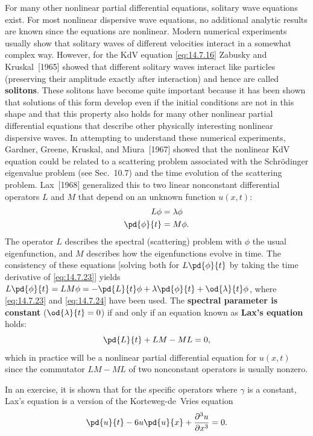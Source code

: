 For many other nonlinear partial differential equations, solitary wave equations exist.  For most nonlinear dispersive wave equations, no additional analytic results are known since the equations are nonlinear.  Modern numerical experiments usually show that solitary waves of different velocities interact in a somewhat complex way.  However, for the KdV equation \eqref{eq:14.7.16} Zabusky and Kruskal~[1965] showed that different solitary waves interact like particles (preserving their amplitude exactly after interaction) and hence are called \textbf{solitons}.  These solitons have become quite important because it has been shown that solutions of this form develop even if the initial conditions are not in this shape and that this property also holds for many other nonlinear partial differential equations that describe other physically interesting nonlinear dispersive waves.  In attempting to understand these numerical experiments, Gardner, Greene, Kruskal, and Miura~[1967] showed that the nonlinear KdV equation could be related to a scattering problem associated with the Schr\"odinger eigenvalue problem (see Sec.~10.7) and the time evolution of the scattering problem.  Lax~[1968] generalized this to two linear nonconstant differential operators $L$ and $M$ that depend on an unknown function $u(x,t)$:
\begin{align}
\label{eq:14.7.23}
L\phi &= \lambda\phi \\
\label{eq:14.7.24}
\pd{\phi}{t} &= M\phi.
\end{align}
The operator $L$ describes the spectral (scattering) problem with $\phi$ the usual eigenfunction, and $M$ describes how the eigenfunctions evolve in time.  The consistency of these equations [solving both for $L\pd{\phi}{t}$ by taking the time derivative of \eqref{eq:14.7.23}] yields $L\pd{\phi}{t} = LM\phi = -\pd{L}{t}\phi + \lambda\pd{\phi}{t} + \od{\lambda}{t}\phi$, where \eqref{eq:14.7.23} and \eqref{eq:14.7.24} have been used.  The \textbf{spectral parameter is constant} ($\od{\lambda}{t} = 0$) if and only if an equation known as \textbf{Lax's equation} holds:
\begin{equation}
\label{eq:14.7.25}
\pd{L}{t} + LM - ML = 0,
\end{equation}
which in practice will be a nonlinear partial differential equation for $u(x,t)$ since the commutator $LM - ML$ of two nonconstant operators is usually nonzero.

In an exercise, it is shown that for the specific operators
where $\gamma$ is a constant, Lax's equation is a version of the Korteweg-de~Vries equation
\begin{equation}
\label{eq:14.7.28}
\pd{u}{t} - 6u\pd{u}{x} + \frac{\partial^3 u}{\partial x^3} = 0.
\end{equation}

